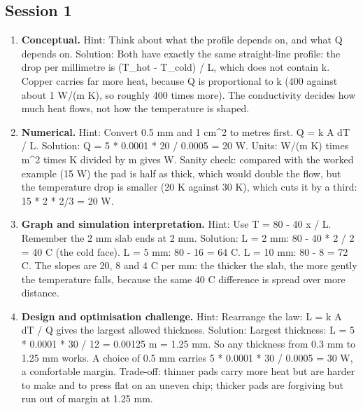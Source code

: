 \documentclass[11pt,a4paper]{article}
\begin{document}
\subsection*{Session 1}
\begin{enumerate}[nosep]
\item \textbf{Conceptual.} Hint: Think about what the profile depends on, and what Q depends on. Solution: Both have exactly the same straight-line profile: the drop per millimetre is (T\_hot - T\_cold) / L, which does not contain k. Copper carries far more heat, because Q is proportional to k (400 against about 1 W/(m K), so roughly 400 times more). The conductivity decides how much heat flows, not how the temperature is shaped.
\item \textbf{Numerical.} Hint: Convert 0.5 mm and 1 cm\textasciicircum{}2 to metres first. Q = k A dT / L. Solution: Q = 5 * 0.0001 * 20 / 0.0005 = 20 W. Units: W/(m K) times m\textasciicircum{}2 times K divided by m gives W. Sanity check: compared with the worked example (15 W) the pad is half as thick, which would double the flow, but the temperature drop is smaller (20 K against 30 K), which cuts it by a third: 15 * 2 * 2/3 = 20 W.
\item \textbf{Graph and simulation interpretation.} Hint: Use T = 80 - 40 x / L. Remember the 2 mm slab ends at 2 mm. Solution: L = 2 mm: 80 - 40 * 2 / 2 = 40 C (the cold face). L = 5 mm: 80 - 16 = 64 C. L = 10 mm: 80 - 8 = 72 C. The slopes are 20, 8 and 4 C per mm: the thicker the slab, the more gently the temperature falls, because the same 40 C difference is spread over more distance.
\item \textbf{Design and optimisation challenge.} Hint: Rearrange the law: L = k A dT / Q gives the largest allowed thickness. Solution: Largest thickness: L = 5 * 0.0001 * 30 / 12 = 0.00125 m = 1.25 mm. So any thickness from 0.3 mm to 1.25 mm works. A choice of 0.5 mm carries 5 * 0.0001 * 30 / 0.0005 = 30 W, a comfortable margin. Trade-off: thinner pads carry more heat but are harder to make and to press flat on an uneven chip; thicker pads are forgiving but run out of margin at 1.25 mm.
\end{enumerate}
\end{document}
